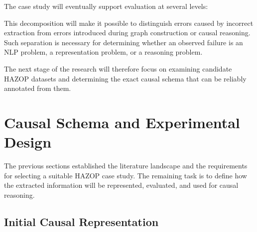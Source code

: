 The case study will eventually support evaluation at several levels:

\begin{center}
\end{center}

This decomposition will make it possible to distinguish errors caused
by incorrect extraction from errors introduced during graph
construction or causal reasoning. Such separation is necessary for
determining whether an observed failure is an NLP problem, a
representation problem, or a reasoning problem.

The next stage of the research will therefore focus on examining
candidate HAZOP datasets and determining the exact causal schema that
can be reliably annotated from them.


\section{Causal Schema and Experimental Design}

The previous sections established the literature landscape and the
requirements for selecting a suitable HAZOP case study. The remaining
task is to define how the extracted information will be represented,
evaluated, and used for causal reasoning.

\subsection{Initial Causal Representation}

